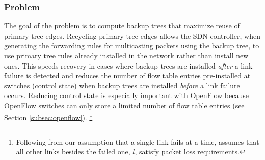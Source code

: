 \subsubsection{\mcn Problem}
\label{subsubsec:min-control}


The goal of the \mc problem is to compute backup trees that maximize reuse of primary tree edges.  
Recycling primary tree edges allows the SDN controller, when generating the forwarding rules for multicasting 
packets using the backup tree, to use primary tree rules already installed in the network rather than install new ones.
This speeds recovery in cases where backup trees are installed \emph{after} a link failure is detected and reduces the number of flow table entries pre-installed at switches (control state) 
when backup trees are installed \emph{before} a link failure occurs.  
Reducing control state is especially important with OpenFlow because OpenFlow switches can only store a limited number of flow table entries (see Section \ref{subsec:openflow}).
\footnote{Following from our assumption that a single link fails at-a-time, \mc assumes that all other links besides the failed one, $l$, satisfy packet loss requirements. }

